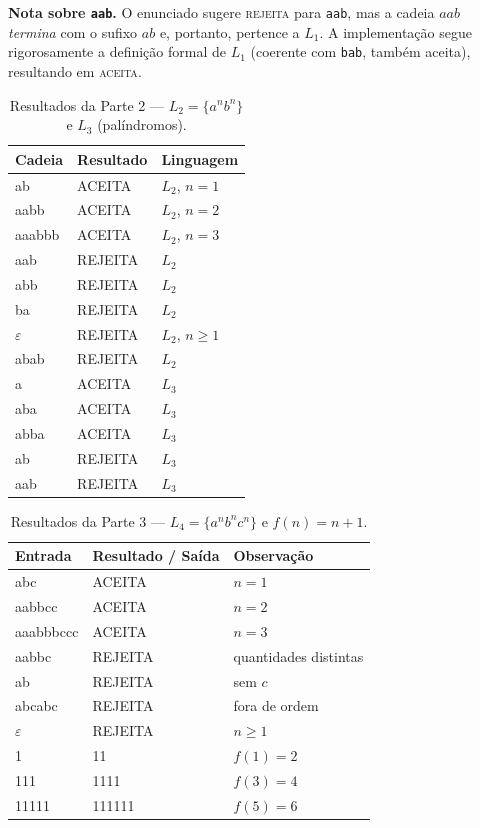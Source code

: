 \documentclass[12pt,a4paper]{article}
\begin{document}
\noindent\textbf{Nota sobre \texttt{aab}.} O enunciado sugere \textsc{rejeita}
para \texttt{aab}, mas a cadeia $aab$ \emph{termina} com o sufixo $ab$ e, portanto,
pertence a $L_1$. A implementação segue rigorosamente a definição formal de $L_1$
(coerente com \texttt{bab}, também aceita), resultando em \textsc{aceita}.

\begin{table}[h]
\centering
\caption{Resultados da Parte 2 --- $L_2 = \{a^n b^n\}$ e $L_3$ (palíndromos).}
\begin{tabular}{llp{4cm}}
\toprule
Cadeia & Resultado & Linguagem \\
\midrule
ab     & ACEITA  & $L_2$, $n=1$ \\
aabb   & ACEITA  & $L_2$, $n=2$ \\
aaabbb & ACEITA  & $L_2$, $n=3$ \\
aab    & REJEITA & $L_2$ \\
abb    & REJEITA & $L_2$ \\
ba     & REJEITA & $L_2$ \\
$\varepsilon$ & REJEITA & $L_2$, $n \geq 1$ \\
abab   & REJEITA & $L_2$ \\
\midrule
a      & ACEITA  & $L_3$ \\
aba    & ACEITA  & $L_3$ \\
abba   & ACEITA  & $L_3$ \\
ab     & REJEITA & $L_3$ \\
aab    & REJEITA & $L_3$ \\
\bottomrule
\end{tabular}
\end{table}

\begin{table}[h]
\centering
\caption{Resultados da Parte 3 --- $L_4 = \{a^n b^n c^n\}$ e $f(n)=n+1$.}
\begin{tabular}{lll}
\toprule
Entrada & Resultado / Saída & Observação \\
\midrule
abc       & ACEITA  & $n=1$ \\
aabbcc    & ACEITA  & $n=2$ \\
aaabbbccc & ACEITA  & $n=3$ \\
aabbc     & REJEITA & quantidades distintas \\
ab        & REJEITA & sem $c$ \\
abcabc    & REJEITA & fora de ordem \\
$\varepsilon$ & REJEITA & $n \geq 1$ \\
\midrule
1     & 11     & $f(1)=2$ \\
111   & 1111   & $f(3)=4$ \\
11111 & 111111 & $f(5)=6$ \\
\bottomrule
\end{tabular}
\end{table}
\end{document}
